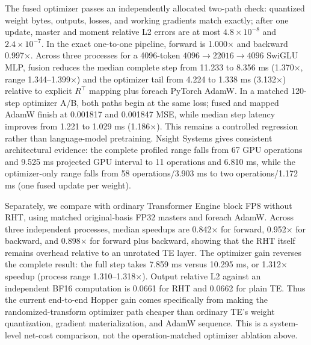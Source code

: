 \documentclass{article}
\begin{document}
The fused optimizer passes an independently allocated two-path check: quantized
weight bytes, outputs, losses, and working gradients match exactly; after one
update, master and moment relative L2 errors are at
most $4.8\times10^{-8}$ and $2.4\times10^{-7}$. In the exact one-to-one
pipeline, forward is 1.000$\times$ and backward 0.997$\times$. Across three
processes for a 4096-token $4096\rightarrow22016\rightarrow4096$ SwiGLU MLP,
fusion reduces the median complete step from 11.233 to 8.356 ms
(1.370$\times$, range 1.344--1.399$\times$) and the optimizer tail from 4.224
to 1.338 ms (3.132$\times$) relative to explicit $R^\top$ mapping plus foreach
PyTorch AdamW. In a matched 120-step optimizer A/B, both paths begin at the same
loss; fused and mapped AdamW finish at 0.001817 and 0.001847 MSE, while median
step latency improves from 1.221 to 1.029 ms (1.186$\times$). This remains a
controlled regression rather than language-model pretraining.
Nsight Systems gives consistent architectural evidence: the complete profiled
range falls from 67 GPU operations and 9.525 ms projected GPU interval to 11
operations and 6.810 ms, while the optimizer-only range falls from 58
operations/3.903 ms to two operations/1.172 ms (one fused update per weight).


Separately, we compare with ordinary Transformer Engine block FP8 without RHT,
using matched
original-basis FP32 masters and foreach AdamW. Across three independent
processes, median speedups are 0.842$\times$ for forward, 0.952$\times$ for
backward, and 0.898$\times$ for forward plus backward, showing that the RHT
itself remains overhead relative to an unrotated TE layer. The optimizer gain
reverses the complete result: the full step takes 7.859 ms versus 10.295 ms,
or 1.312$\times$ speedup (process range 1.310--1.318$\times$). Output relative
L2 against an independent BF16 computation is 0.0661 for RHT and 0.0662 for
plain TE. Thus the current end-to-end Hopper gain comes specifically from
making the randomized-transform optimizer path cheaper than ordinary TE's
weight quantization, gradient materialization, and AdamW sequence.
This is a system-level net-cost comparison, not the operation-matched optimizer
ablation above.

\end{document}
